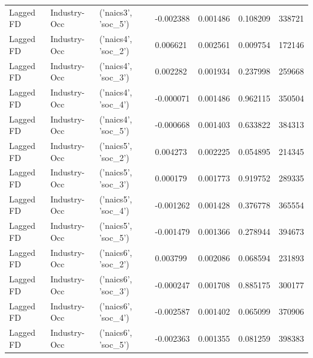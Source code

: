 \begin{table}
\begin{tabular}{llllrrr}
Lagged FD & Industry-Occ & ('naics3', 'soc_5') & -0.002388 & 0.001486 & 0.108209 & 338721 \\
Lagged FD & Industry-Occ & ('naics4', 'soc_2') & 0.006621 & 0.002561 & 0.009754 & 172146 \\
Lagged FD & Industry-Occ & ('naics4', 'soc_3') & 0.002282 & 0.001934 & 0.237998 & 259668 \\
Lagged FD & Industry-Occ & ('naics4', 'soc_4') & -0.000071 & 0.001486 & 0.962115 & 350504 \\
Lagged FD & Industry-Occ & ('naics4', 'soc_5') & -0.000668 & 0.001403 & 0.633822 & 384313 \\
Lagged FD & Industry-Occ & ('naics5', 'soc_2') & 0.004273 & 0.002225 & 0.054895 & 214345 \\
Lagged FD & Industry-Occ & ('naics5', 'soc_3') & 0.000179 & 0.001773 & 0.919752 & 289335 \\
Lagged FD & Industry-Occ & ('naics5', 'soc_4') & -0.001262 & 0.001428 & 0.376778 & 365554 \\
Lagged FD & Industry-Occ & ('naics5', 'soc_5') & -0.001479 & 0.001366 & 0.278944 & 394673 \\
Lagged FD & Industry-Occ & ('naics6', 'soc_2') & 0.003799 & 0.002086 & 0.068594 & 231893 \\
Lagged FD & Industry-Occ & ('naics6', 'soc_3') & -0.000247 & 0.001708 & 0.885175 & 300177 \\
Lagged FD & Industry-Occ & ('naics6', 'soc_4') & -0.002587 & 0.001402 & 0.065099 & 370906 \\
Lagged FD & Industry-Occ & ('naics6', 'soc_5') & -0.002363 & 0.001355 & 0.081259 & 398383 \\
\bottomrule
\end{tabular}
\end{table}
